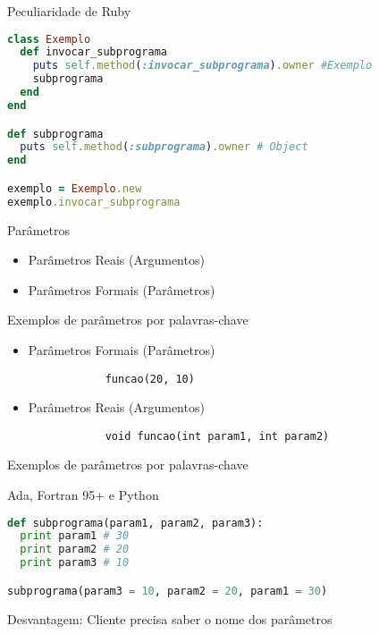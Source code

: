 \begin{frame}[fragile]{Peculiaridade de Ruby}
    
	\begin{lstlisting}[language=ruby]
class Exemplo
  def invocar_subprograma
    puts self.method(:invocar_subprograma).owner #Exemplo
    subprograma
  end
end

def subprograma
  puts self.method(:subprograma).owner # Object
end

exemplo = Exemplo.new
exemplo.invocar_subprograma
	\end{lstlisting}

\end{frame}

\begin{frame}{Parâmetros}
	
	\begin{itemize}
		\item Parâmetros Reais (Argumentos)
		\item Parâmetros Formais (Parâmetros)
	\end{itemize}

\end{frame}

\begin{frame}[fragile]{Exemplos de parâmetros por palavras-chave}
	
	\begin{itemize}

		\item Parâmetros Formais (Parâmetros)
		\begin{verbatim}
			funcao(20, 10)
		\end{verbatim}

		\item Parâmetros Reais (Argumentos)
		\begin{verbatim}
			void funcao(int param1, int param2)
		\end{verbatim}
	\end{itemize}

\end{frame}

\begin{frame}[fragile]{Exemplos de parâmetros por palavras-chave}

 Ada, Fortran 95+ e Python     
	\begin{lstlisting}[language=python]
def subprograma(param1, param2, param3):
  print param1 # 30
  print param2 # 20
  print param3 # 10

subprograma(param3 = 10, param2 = 20, param1 = 30)

	\end{lstlisting}
Desvantagem: Cliente precisa saber o nome dos parâmetros
\end{frame}

